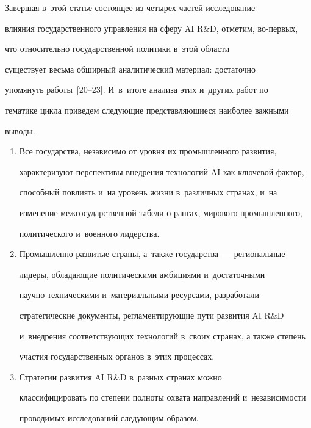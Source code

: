      


     Завершая в~этой статье состоящее из четырех частей исследование 


влияния государственного управления на сферу AI R\&D, отметим, во-пер\-вых, 


что относительно государственной политики в~этой об\-ласти 


существует весьма обширный аналитический материал: достаточно 


упомянуть работы~[20--23]. И~в~итоге анализа этих и~других работ по 


тематике цикла приведем сле\-ду\-ющие пред\-став\-ля\-ющи\-еся наиболее важными 


выводы.


     \begin{enumerate}[1.]


\item Все государства, независимо от уровня их промышленного развития, 


характеризуют перспективы внедрения технологий AI как ключевой фактор, 


способный повлиять и~на уровень жизни в~различных странах, и~на 


изменение межгосударственной табели о рангах, мирового промышленного, 


политического и~военного лидерства.


\item Промышленно развитые страны, а~так\-же государства~--- региональные 


лидеры, об\-ла\-да\-ющие политическими амбициями и~достаточными  


на\-уч\-но-тех\-ни\-че\-ски\-ми и~материальными ресурсами, разработали 


стратегические документы, рег\-ла\-мен\-ти\-ру\-ющие пути развития AI R\&D 


и~внед\-ре\-ния соответствующих технологий в~своих странах, а также степень 


учас\-тия государственных органов в~этих процессах.


\item Стратегии развития AI R\&D в~разных странах можно 


классифицировать по степени полноты охвата на\-прав\-ле\-ний и~не\-за\-ви\-си\-мости 


проводимых исследований следующим образом.


\begin{enumerate}[3.1]



\end{enumerate}
\end{enumerate}
